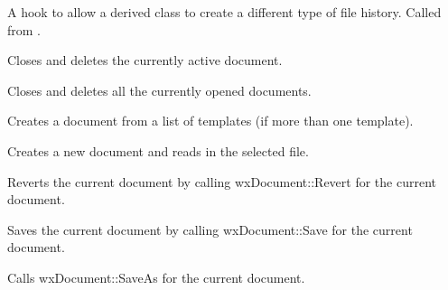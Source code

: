 A hook to allow a derived class to create a different type of file history. Called
from .


\label{wxdocmanageronfileclose}


Closes and deletes the currently active document.


\label{wxdocmanageronfilecloseall}


Closes and deletes all the currently opened documents.


\label{wxdocmanageronfilenew}


Creates a document from a list of templates (if more than one template).


\label{wxdocmanageronfileopen}


Creates a new document and reads in the selected file.


\label{wxdocmanageronfilerevert}


Reverts the current document by calling wxDocument::Revert for the current document.


\label{wxdocmanageronfilesave}


Saves the current document by calling wxDocument::Save for the current document.


\label{wxdocmanageronfilesaveas}


Calls wxDocument::SaveAs for the current document.


\label{wxdocmanagerremovedocument}


